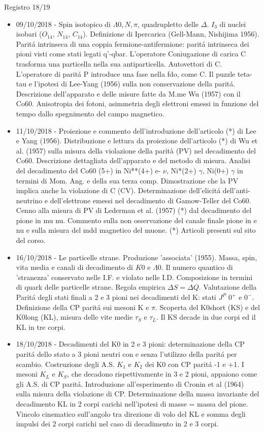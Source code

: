 \begin{frame}[allowframebreaks]{Registro 18/19}
\begin{itemize}
\item 09/10/2018 - Spin isotopico di $\Lambda0, N, \pi$, quadrupletto delle $\Delta$. $I_3$ di nuclei isobari ($O_{14}$, $N_{14}$, $C_{14}$). Definizione di Ipercarica (Gell-Mann, Nishijima 1956). Parit\'a intrinseca di una coppia fermione-antifermione: parit\'a intrinseca dei pioni visti come stati legati q'-qbar. L'operatore Coniugazione di carica C trasforma una particella nella sua antiparticella. Autovettori di C. L'operatore di parit\'a P introduce una fase nella fdo, come C. Il puzzle teta-tau e l'ipotesi di Lee-Yang (1956) sulla non conservazione della parit\'a. Descrizione dell'apparato e delle misure fatte da M.me Wu (1957) con il Co60. Anisotropia dei fotoni, asimmetria degli elettroni emessi in funzione del tempo dallo spegnimento del campo magnetico.
\item 11/10/2018 - Proiezione e commento dell'introduzione dell'articolo (*) di Lee e Yang (1956). Distribuzione e lettura da proiezione dell'articolo (*) di Wu et al. (1957) sulla misura della violazione della parità (PV) nel decadimento del Co60. Descrizione dettagliata dell'apparato e del metodo di misura. Analisi del decadimento del Co60 (5+) in Ni**(4+) e- $\nu$, Ni*(2+) $\gamma$, Ni(0+) $\gamma$ in termini di Mom. Ang. e della sua terza comp. Dimostrazione che la PV implica anche la violazione di C (CV). Determinazione dell'elicit\'a dell'anti-neutrino e dell'elettrone emessi nel decadimento di Gamow-Teller del Co60. Cenno alla misura di PV di Lederman et al. (1957) (*) dal decadimento del pione in mu nu. Commento sulla non osservazione del canale finale pione in e nu e sulla misura del mdd magnetico del muone. (*) Articoli presenti sul sito del corso.
\item 16/10/2018 - Le particelle strane. Produzione 'associata' (1955). Massa, spin, vita media e canali di decadimento di $K0$ e $\Lambda0$. Il numero quantico di 'stranezza' conservato nelle I.F. e violato nelle I.D. Composizione in termini di quark delle particelle strane. Regola empirica $\Delta S=\Delta Q$. Valutazione della Parit\'a degli stati finali a 2 e 3 pioni nei decadimenti del K: stati $J^P$ $0^+$ e $0^-$. Definizione della CP parit\'a sui mesoni K e $\pi$. Scoperta del K0short (KS) e del K0long (KL), misura delle vite medie $\tau_S$ e $\tau_L$. Il KS decade in due corpi ed il KL in tre corpi.
\item 18/10/2018 - Decadimenti del K0 in 2 e 3 pioni: determinazione della CP parit\'a dello stato a 3 pioni neutri con e senza l'utilizzo della parit\'a per scambio. Costruzione degli A.S. $K_1$ e $K_2$ dei K0 con CP parit\'a -1 e +1. I mesoni $K_L$ e $K_S$, che decadono rispettivamente in 3 e 2 pioni, appaiono come gli A.S. di CP parit\'a. Introduzione all'esperimento di Cronin et al (1964) sulla misura della violazione di CP. Determinazione della massa invariante del decadimento KL in 2 corpi carichi nell'ipotesi di masse = massa del pione. Vincolo cinematico sull'angolo tra direzione di volo del KL e somma degli impulsi dei 2 corpi carichi nel caso di decadimento in 2 e 3 corpi.

\end{itemize}
\end{frame}
